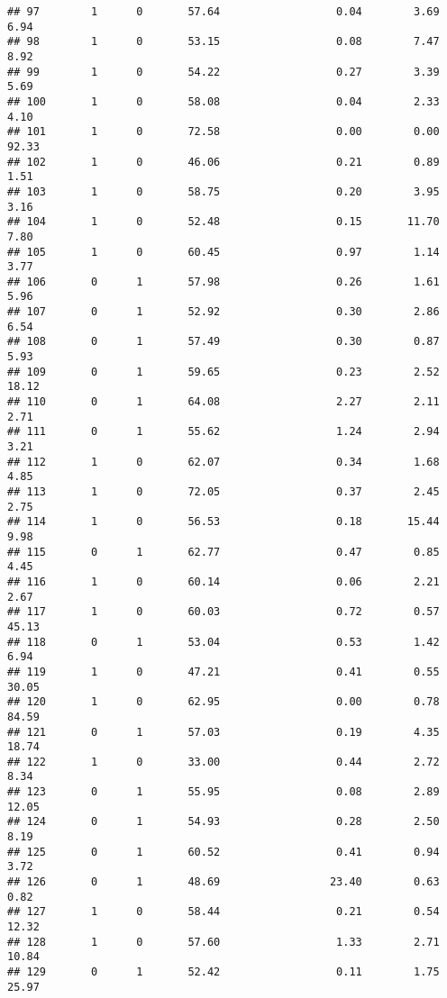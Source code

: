 \documentclass[
]{article}
\begin{document}
\begin{verbatim}
## 97        1      0       57.64                  0.04        3.69        6.94
## 98        1      0       53.15                  0.08        7.47        8.92
## 99        1      0       54.22                  0.27        3.39        5.69
## 100       1      0       58.08                  0.04        2.33        4.10
## 101       1      0       72.58                  0.00        0.00       92.33
## 102       1      0       46.06                  0.21        0.89        1.51
## 103       1      0       58.75                  0.20        3.95        3.16
## 104       1      0       52.48                  0.15       11.70        7.80
## 105       1      0       60.45                  0.97        1.14        3.77
## 106       0      1       57.98                  0.26        1.61        5.96
## 107       0      1       52.92                  0.30        2.86        6.54
## 108       0      1       57.49                  0.30        0.87        5.93
## 109       0      1       59.65                  0.23        2.52       18.12
## 110       0      1       64.08                  2.27        2.11        2.71
## 111       0      1       55.62                  1.24        2.94        3.21
## 112       1      0       62.07                  0.34        1.68        4.85
## 113       1      0       72.05                  0.37        2.45        2.75
## 114       1      0       56.53                  0.18       15.44        9.98
## 115       0      1       62.77                  0.47        0.85        4.45
## 116       1      0       60.14                  0.06        2.21        2.67
## 117       1      0       60.03                  0.72        0.57       45.13
## 118       0      1       53.04                  0.53        1.42        6.94
## 119       1      0       47.21                  0.41        0.55       30.05
## 120       1      0       62.95                  0.00        0.78       84.59
## 121       0      1       57.03                  0.19        4.35       18.74
## 122       1      0       33.00                  0.44        2.72        8.34
## 123       0      1       55.95                  0.08        2.89       12.05
## 124       0      1       54.93                  0.28        2.50        8.19
## 125       0      1       60.52                  0.41        0.94        3.72
## 126       0      1       48.69                 23.40        0.63        0.82
## 127       1      0       58.44                  0.21        0.54       12.32
## 128       1      0       57.60                  1.33        2.71       10.84
## 129       0      1       52.42                  0.11        1.75       25.97

\end{verbatim}
\end{document}
